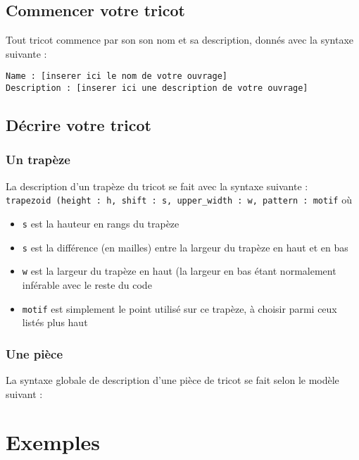 \documentclass[a4paper,10pt]{article}
\begin{document}
  \subsection{Commencer votre tricot}
  
Tout tricot commence par son son nom et sa description, donnés avec la syntaxe suivante :

\noindent \texttt{Name : [inserer ici le nom de votre ouvrage] \\
  Description : [inserer ici une description de votre ouvrage]}
  
  \subsection{Décrire votre tricot}

\subsubsection{Un trapèze}

  La description d'un trapèze du tricot se fait avec la syntaxe suivante : \\
\texttt{trapezoid (height : h, shift : s, upper\_width : w, pattern : motif} où 
\begin{itemize}
\item \texttt{s} est la hauteur en rangs du trapèze
\item \texttt{s} est la différence (en mailles) entre la largeur du trapèze en haut et en bas
\item \texttt{w} est la largeur du trapèze en haut (la largeur en bas étant normalement inférable avec le reste du code
\item \texttt{motif} est simplement le point utilisé sur ce trapèze, à choisir parmi ceux listés plus haut
\end{itemize}

\subsubsection{Une pièce}

La syntaxe globale de description d'une pièce de tricot se fait selon le modèle suivant :\\
  

\appendix

\section{Exemples}
\end{document}
